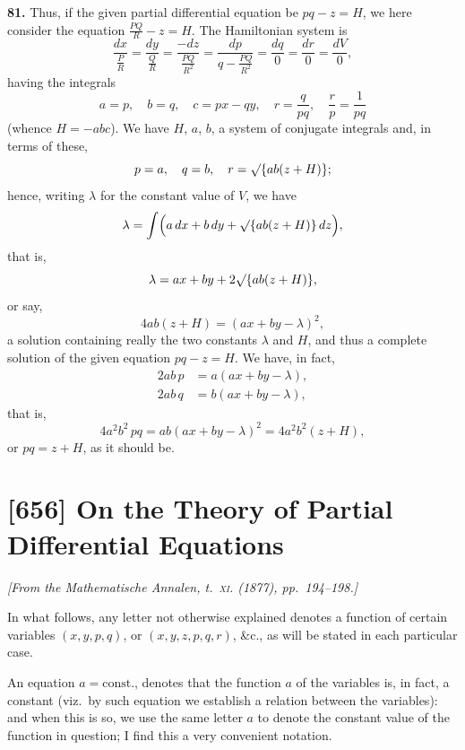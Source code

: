 \documentclass[11pt,a4paper]{book}
\begin{document}
\smallskip

\noindent\textbf{81.} Thus, if the given partial differential equation be $pq - z = H$, we here consider the equation $\frac{PQ}{R} - z = H$. The Hamiltonian system is
\[
\frac{dx}{\frac{P}{R}} = \frac{dy}{\frac{Q}{R}} = \frac{-dz}{\frac{PQ}{R^2}} = \frac{dp}{q - \frac{PQ}{R^2}} = \frac{dq}{0} = \frac{dr}{0} = \frac{dV}{0},
\]
having the integrals
\[
a = p, \quad b = q, \quad c = px - qy, \quad r = \frac{q}{pq}, \quad \frac{r}{p} = \frac{1}{pq}
\]
(whence $H = -abc$). We have $H$, $a$, $b$, a system of conjugate integrals and, in terms of these,
\[
p = a, \quad q = b, \quad r = \surd\{ab(z + H)\};
\]
hence, writing $\lambda$ for the constant value of $V$, we have
\[
\lambda = \int\Bigl(a\,dx + b\,dy + \surd\{ab(z + H)\}\,dz\Bigr),
\]
that is,
\[
\lambda = ax + by + 2\surd\{ab(z + H)\},
\]
or say,
\[
4ab(z + H) = (ax + by - \lambda)^2,
\]
a solution containing really the two constants $\lambda$ and $H$, and thus a complete solution of the given equation $pq - z = H$. We have, in fact,
\begin{align*}
2ab\,p &= a(ax + by - \lambda), \\
2ab\,q &= b(ax + by - \lambda),
\end{align*}
that is,
\[
4a^2b^2\,pq = ab(ax + by - \lambda)^2 = 4a^2b^2(z + H),
\]
or $pq = z + H$, as it should be.

\newpage
\section{[656] On the Theory of Partial Differential Equations}
\label{sec:656}

\noindent\textit{[From the \emph{Mathematische Annalen}, t.~\textsc{xi}. (1877), pp.~194--198.]}

\medskip

In what follows, any letter not otherwise explained denotes a function of certain variables $(x, y, p, q)$, or $(x, y, z, p, q, r)$, \&c., as will be stated in each particular case.

An equation $a = \text{const.}$, denotes that the function $a$ of the variables is, in fact, a constant (viz.~by such equation we establish a relation between the variables): and when this is so, we use the same letter $a$ to denote the constant value of the function in question; I find this a very convenient notation.
\end{document}
